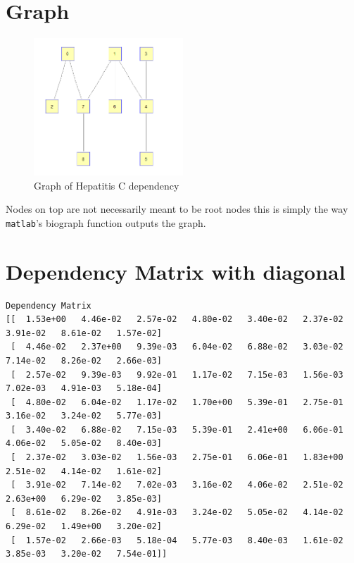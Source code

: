 \documentclass[10pt,a4paper]{article}
\begin{document}
\section{Graph}
\begin{figure}[h!]
  \caption{Graph of Hepatitis C dependency}
  \centering
    \includegraphics[width=0.5\textwidth]{network.png}
\end{figure}
Nodes on top are not necessarily meant to be root nodes this is simply the way \texttt{matlab}'s biograph function outputs the graph.
\section{Dependency Matrix with diagonal}
\begin{verbatim}
Dependency Matrix
[[  1.53e+00   4.46e-02   2.57e-02   4.80e-02   3.40e-02   2.37e-02    3.91e-02   8.61e-02   1.57e-02]
 [  4.46e-02   2.37e+00   9.39e-03   6.04e-02   6.88e-02   3.03e-02    7.14e-02   8.26e-02   2.66e-03]
 [  2.57e-02   9.39e-03   9.92e-01   1.17e-02   7.15e-03   1.56e-03    7.02e-03   4.91e-03   5.18e-04]
 [  4.80e-02   6.04e-02   1.17e-02   1.70e+00   5.39e-01   2.75e-01    3.16e-02   3.24e-02   5.77e-03]
 [  3.40e-02   6.88e-02   7.15e-03   5.39e-01   2.41e+00   6.06e-01    4.06e-02   5.05e-02   8.40e-03]
 [  2.37e-02   3.03e-02   1.56e-03   2.75e-01   6.06e-01   1.83e+00    2.51e-02   4.14e-02   1.61e-02]
 [  3.91e-02   7.14e-02   7.02e-03   3.16e-02   4.06e-02   2.51e-02    2.63e+00   6.29e-02   3.85e-03]
 [  8.61e-02   8.26e-02   4.91e-03   3.24e-02   5.05e-02   4.14e-02    6.29e-02   1.49e+00   3.20e-02]
 [  1.57e-02   2.66e-03   5.18e-04   5.77e-03   8.40e-03   1.61e-02    3.85e-03   3.20e-02   7.54e-01]]
\end{verbatim}
\end{document}
